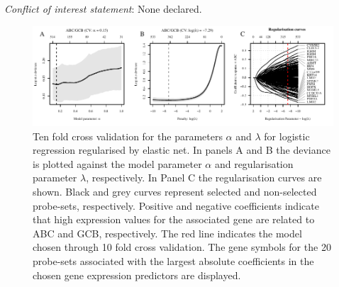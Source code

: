 \documentclass{article}
\begin{document}
\noindent\textit{Conflict of interest statement}: None declared.
{}




\begin{figure}[htb]
\begin{center}
\includegraphics[width=1\textwidth]{figures/CrosvalidationClass.pdf}
\end{center}
\caption{Ten fold cross validation for the parameters $\alpha$ and $\lambda$ for logistic regression regularised by elastic net.
In panels A and B the deviance is plotted against the model parameter $\alpha$ and regularisation parameter $\lambda$, respectively.
In Panel C the regularisation curves are shown.
Black and grey curves represent selected and non-selected probe-sets, respectively.
Positive and negative coefficients indicate that high expression values for the associated gene are related to ABC and GCB, respectively.
The red line indicates the model chosen through 10 fold cross validation.
The gene symbols for the 20 probe-sets associated with the largest absolute coefficients in the chosen gene expression predictors are displayed.}
\label{fig:crossval}
\end{figure}








\listoftodos
\end{document}
